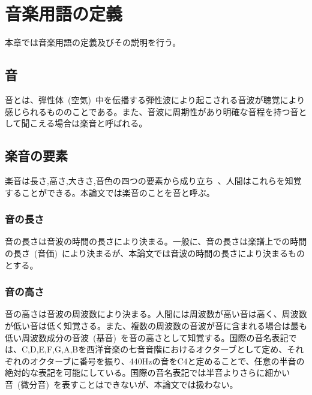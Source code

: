 \chapter{音楽用語の定義}

本章では音楽用語の定義及びその説明を行う。

\section{音}

音とは、弾性体~(空気)~中を伝播する弾性波により起こされる音波が聴覚により感じられるもののことである。また、音波に周期性があり明確な音程を持つ音として聞こえる場合は楽音と呼ばれる。

\section{楽音の要素}

楽音は長さ,高さ,大きさ,音色の四つの要素から成り立ち~\cite{音楽の基礎}、人間はこれらを知覚することができる。本論文では楽音のことを音と呼ぶ。

\subsection{音の長さ}

音の長さは音波の時間の長さにより決まる。一般に、音の長さは楽譜上での時間の長さ~(音価)~により決まるが、本論文では音波の時間の長さにより決まるものとする。

\subsection{音の高さ}

音の高さは音波の周波数により決まる。人間には周波数が高い音は高く、周波数が低い音は低く知覚さる。また、複数の周波数の音波が音に含まれる場合は最も低い周波数成分の音波~(基音)~を音の高さとして知覚する。国際の音名表記では、C,D,E,F,G,A,Bを西洋音楽の七音音階におけるオクターブとして定め、それぞれのオクターブに番号を振り、440Hzの音をC4と定めることで、任意の半音の絶対的な表記を可能にしている。国際の音名表記では半音よりさらに細かい音~(微分音)~を表すことはできないが、本論文では扱わない。


